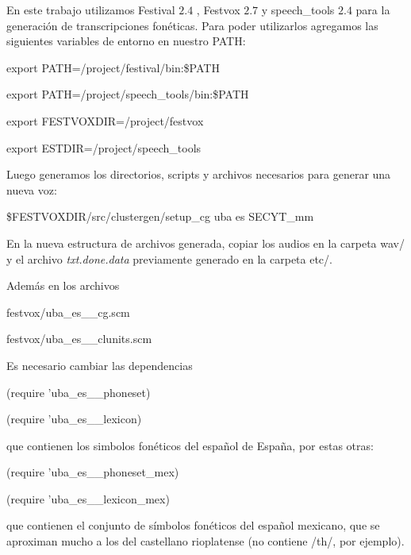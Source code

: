 En este trabajo utilizamos Festival $2.4$ \cite{festivalDownload}, Festvox $2.7$ \cite{festvoxDownload} y speech\_tools $2.4$ \cite{speechToolDownload} para la generación de transcripciones fonéticas. Para poder utilizarlos agregamos las siguientes variables de entorno en nuestro PATH:

\begin{tcolorbox}
export PATH=/project/festival/bin:\$PATH

export PATH=/project/speech\_tools/bin:\$PATH

export FESTVOXDIR=/project/festvox

export ESTDIR=/project/speech\_tools
\end{tcolorbox}

Luego generamos los directorios, scripts y archivos necesarios para generar una nueva voz:
\begin{tcolorbox}
\$FESTVOXDIR/src/clustergen/setup\_cg uba es SECYT\_mm
\end{tcolorbox}

En la nueva estructura de archivos generada, copiar los audios en la carpeta wav/ y el archivo \textit{txt.done.data} previamente generado en la carpeta etc/.

Además en los archivos 

\begin{tcolorbox}
festvox/uba\_es\_\_cg.scm 

festvox/uba\_es\_\_clunits.scm
\end{tcolorbox}

\noindent Es necesario cambiar las dependencias 

\begin{tcolorbox}
(require 'uba\_es\_\_phoneset)

(require 'uba\_es\_\_lexicon)
\end{tcolorbox}

\noindent que contienen los simbolos fonéticos del español de España, por estas otras:

\begin{tcolorbox}
(require 'uba\_es\_\_phoneset\_mex)

(require 'uba\_es\_\_lexicon\_mex)
\end{tcolorbox}

\noindent que contienen el conjunto de símbolos fonéticos del español mexicano, que se aproximan mucho a los del castellano rioplatense (no contiene /th/, por ejemplo).

